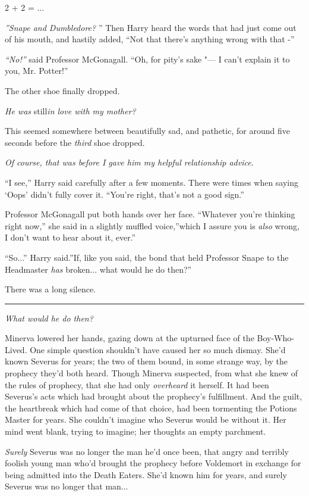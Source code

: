 2 + 2 = ...

\emph{''Snape and Dumbledore?} '' Then Harry heard the words that had just
come out of his mouth, and hastily added, ``Not that there's anything
wrong with that -''

\emph{``No!''} said Professor McGonagall. ``Oh, for pity's sake "--- I
can't explain it to you, Mr. Potter!''

The other shoe finally dropped.

\emph{He was} still\emph{in love with my mother?}

This seemed somewhere between beautifully sad, and pathetic, for around
five seconds before the \emph{third} shoe dropped.

\emph{Of course, that was before I gave him my helpful relationship
advice.}

``I see,'' Harry said carefully after a few moments. There were times
when saying `Oops' didn't fully cover it. ``You're right, that's not a
good sign.''

Professor McGonagall put both hands over her face. ``Whatever you're
thinking right now,'' she said in a slightly muffled voice,''which I
assure you is \emph{also} wrong, I don't want to hear about it, ever.''

``So...'' Harry said.''If, like you said, the bond that held
Professor Snape to the Headmaster \emph{has} broken... what would
he do then?''

There was a long silence.

\begin{center}\rule{3in}{0.4pt}\end{center}

\emph{What would he do then?}

Minerva lowered her hands, gazing down at the upturned face of the
Boy-Who-Lived. One simple question shouldn't have caused her so much
dismay. She'd known Severus for years; the two of them bound, in some
strange way, by the prophecy they'd both heard. Though Minerva
suspected, from what she knew of the rules of prophecy, that she had
only \emph{overheard} it herself. It had been Severus's acts which had
brought about the prophecy's fulfillment. And the guilt, the heartbreak
which had come of that choice, had been tormenting the Potions Master
for years. She couldn't imagine who Severus would be without it. Her
mind went blank, trying to imagine; her thoughts an empty parchment.

\emph{Surely} Severus was no longer the man he'd once been, that angry
and terribly foolish young man who'd brought the prophecy before
Voldemort in exchange for being admitted into the Death Eaters. She'd
known him for years, and surely Severus was no longer that man...

